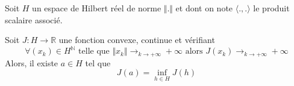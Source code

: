 





  Soit $H$ un espace de Hilbert réel de norme $\Vert . \Vert$ et dont on note $\langle ., . \rangle$ le produit scalaire associé.


  \begin{theorem}
    Soit $J : H \rightarrow \mathbb{R}$ une fonction convexe, continue et vérifiant
    \[ \forall (x_k) \in H^{\mathbb{N}} \text{ telle que } \Vert x_k \Vert \longrightarrow_{k \rightarrow +\infty} +\infty \text{ alors } J(x_k) \longrightarrow_{k \rightarrow +\infty} +\infty \]
    Alors, il existe $a \in H$ tel que
    \[ J(a) = \inf_{h \in H} J(h) \]
  \end{theorem}


